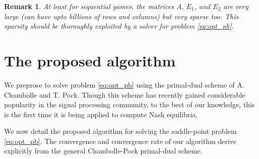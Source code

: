 \documentclass[a4paper,9pt,journal]{IEEEtran}
\newtheorem{remark}{Remark}
\begin{document}
\begin{remark}
  At least for sequential games, the matrices $A$, $E_1$, and $E_2$ are very large (can have upto billions of rows and columns) but very sparse too.
This sparsity should be thoroughly exploited by a solver for problem \eqref{eq:opt_pb}.
\end{remark}




\section{The proposed algorithm}
We preprose to solve problem \eqref{eq:opt_pb} using the primal-dual scheme of A. Chambolle and T. Pock.
Though this scheme has recently gained considerable popularity in the signal processing community, to the best of our knowledge,
this is the first time it is being applied to compute Nash equilibria.

We now detail the proposed algorithm for solving the saddle-point problem \eqref{eq:opt_pb}. The convergence and convergence rate
of our algorithm derive explicitly from the general Chambolle-Pock primal-dual scheme.

\end{document}
